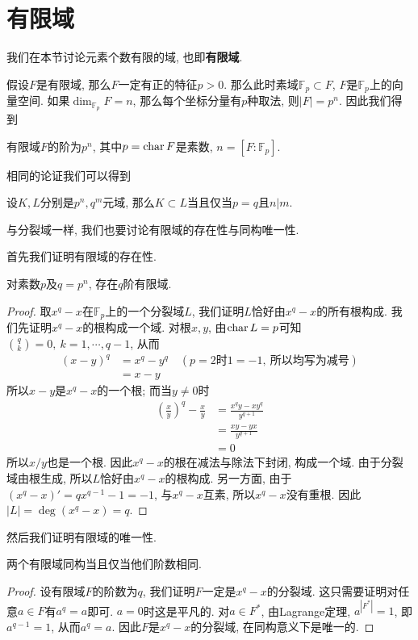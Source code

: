 \section{有限域}

我们在本节讨论元素个数有限的域, 也即\textbf{有限域}.

假设$F$是有限域, 那么$F$一定有正的特征$p>0$.
那么此时素域$\mathbb{F}_p\subset F$, $F$是$\mathbb{F}_p$上的向量空间.
如果$\dim_{\mathbb{F}_p}F=n$, 那么每个坐标分量有$p$种取法, 则$|F|=p^n$.
因此我们得到
\begin{prop}
    有限域$F$的阶为$p^n$, 其中$p=\operatorname{char}{F}$是素数, $n=[F:\mathbb{F}_p]$.
\end{prop}

相同的论证我们可以得到
\begin{prop}\label{finite subfield}
    设$K,L$分别是$p^n,q^m$元域, 那么$K\subset L$当且仅当$p=q$且$n|m$.
\end{prop}

与分裂域一样, 我们也要讨论有限域的存在性与同构唯一性.

首先我们证明有限域的存在性.
\begin{thm}
    对素数$p$及$q=p^n$, 存在$q$阶有限域.
\end{thm}
\begin{proof}
    取$x^q-x$在$\mathbb{F}_p$上的一个分裂域$L$, 我们证明$L$恰好由$x^q-x$的所有根构成.
    我们先证明$x^q-x$的根构成一个域.
    对根$x,y$, 由$\operatorname{char} L=p$可知$\binom{q}{k}=0,\ k=1,\cdots,q-1$, 从而
    \begin{align*}
        (x-y)^q&=x^q-y^q\quad(p=2\text{时}1=-1,\ \text{所以均写为减号})\\
        &=x-y
    \end{align*}
    所以$x-y$是$x^q-x$的一个根;
    而当$y\neq 0$时
    \begin{align*}
        \left(\frac{x}{y}\right)^q-\frac{x}{y}&=\frac{x^qy-xy^q}{y^{q+1}}\\
        &=\frac{xy-yx}{y^{q+1}}\\
        &=0
    \end{align*}
    所以$x/y$也是一个根.
    因此$x^q-x$的根在减法与除法下封闭, 构成一个域.
    由于分裂域由根生成, 所以$L$恰好由$x^q-x$的根构成.
    另一方面, 由于$(x^q-x)'=qx^{q-1}-1=-1$, 与$x^q-x$互素, 所以$x^q-x$没有重根.
    因此$|L|=\deg(x^q-x)=q$.
\end{proof}

然后我们证明有限域的唯一性.
\begin{thm}
    两个有限域同构当且仅当他们阶数相同.
\end{thm}
\begin{proof}
    设有限域$F$的阶数为$q$, 我们证明$F$一定是$x^q-x$的分裂域.
    这只需要证明对任意$a\in F$有$a^q=a$即可.
    $a=0$时这是平凡的.
    对$a\in F^*$, 由Lagrange定理, $a^{|F^*|}=1$, 即$a^{q-1}=1$, 从而$a^q=a$.
    因此$F$是$x^q-x$的分裂域, 在同构意义下是唯一的.
\end{proof}


